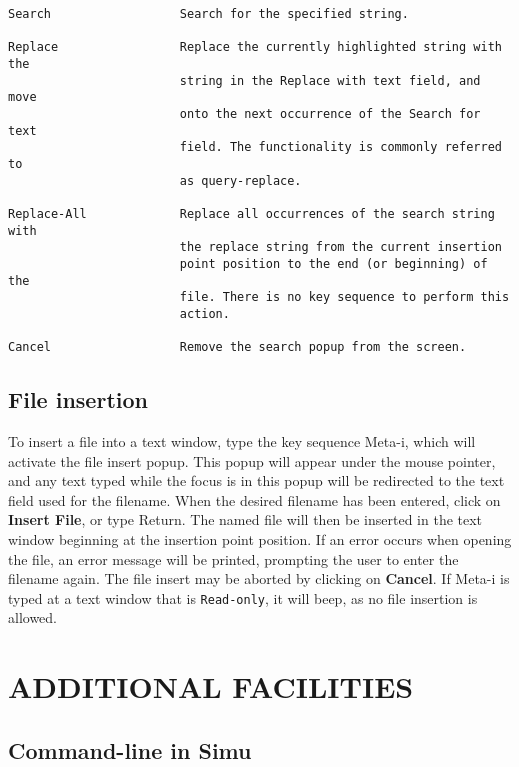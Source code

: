\begin{sloppypar}
\begin{verbatim}
Search                  Search for the specified string.

Replace                 Replace the currently highlighted string with the
                        string in the Replace with text field, and move
                        onto the next occurrence of the Search for text
                        field. The functionality is commonly referred to
                        as query-replace.

Replace-All             Replace all occurrences of the search string with
                        the replace string from the current insertion
                        point position to the end (or beginning) of the
                        file. There is no key sequence to perform this
                        action.

Cancel                  Remove the search popup from the screen.
\end{verbatim}

\subsection{File insertion}

To insert a file into a text window, type the key sequence Meta-i,
which will activate the file insert popup. This popup will appear
under the mouse pointer, and any text typed while the focus is in this
popup will be redirected to the text field used for the filename. When
the desired filename has been entered, click on {\bf Insert File}, or
type Return. The named file will then be inserted in the text window
beginning at the insertion point position. If an error occurs when
opening the file, an error message will be printed, prompting the user
to enter the filename again.  The file insert may be aborted by
clicking on {\bf Cancel}. If Meta-i is typed at a text window that is
{\tt Read-only}, it will beep, as no file insertion is allowed.



\section{ADDITIONAL FACILITIES}


\subsection{Command-line in Simu}


\end{sloppypar}
